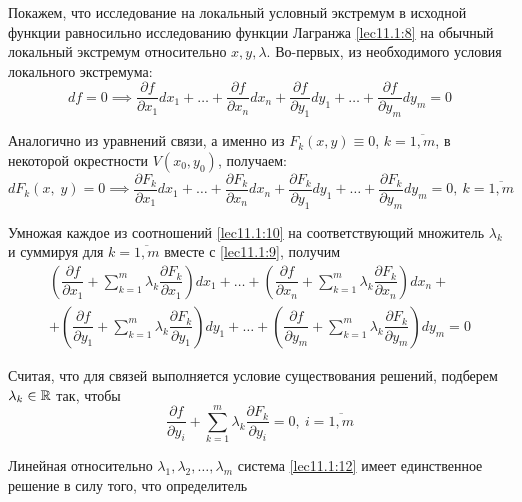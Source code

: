 \documentclass[../../main.tex]{subfiles}
\begin{document}
	
	Покажем, что исследование на локальный условный экстремум в исходной 
	функции равносильно исследованию функции Лагранжа 
	\eqref{lec11.1:8} на обычный локальный экстремум относительно $x, y,\lambda$.
	Во-первых, из необходимого условия локального экстремума:
	\begin{equation}
	df = 0 \implies \dfrac{\partial f}{\partial x_1} dx_1 + \ldots + 
	\dfrac{\partial f}{\partial x_n} dx_n + \dfrac{\partial f}{\partial y_1}dy_1
	 + \ldots + \dfrac{\partial f}{\partial y_m} dy_m = 0 \label{lec11.1:9}
	\end{equation}
	
	Аналогично из уравнений связи, а именно из $F_k(x, y) \equiv 0$, $k = 
	\overline{1, 
	m}$, в некоторой окрестности $V(x_0, y_0)$, получаем:
	\begin{equation}
	dF_k\left(x, \; y\right) = 0 \implies \dfrac{\partial 
	F_k}{\partial x_1}dx_1 + 
	\ldots + \dfrac{\partial F_k}{\partial x_n}dx_n + 
	\dfrac{\partial F_k}{\partial y_1}dy_1 + \ldots + 
	\dfrac{\partial F_k}{\partial y_m}dy_m = 0,\ k = \overline{1, m} 
	\label{lec11.1:10}
	\end{equation}
	
	Умножая каждое из соотношений \eqref{lec11.1:10} на соответствующий множитель 
	$\lambda_k$ и суммируя для $k = \overline{1, m}$ 
	вместе с \eqref{lec11.1:9}, получим
	\begin{multline}
	\left(\dfrac{\partial f}{\partial x_1} + \sum\limits_{k
	= 1}^m \lambda_k \dfrac{\partial F_k}{\partial x_1} 
	\right)dx_1 + \ldots + \left(\dfrac{\partial f}
	{\partial x_n} + \sum\limits_{k = 1}^m \lambda_k 
	\dfrac{\partial F_k}{\partial x_n} \right)dx_n + \\ +
	\left(\dfrac{\partial f}{\partial y_1} + 
	\sum\limits_{k = 1}^m \lambda_k \dfrac{\partial F_k}
	{\partial y_1} \right)dy_1 +
	\ldots 
	+ \left(\dfrac{\partial f}{\partial y_m} + 
	\sum\limits_{k = 1}^m \lambda_k \dfrac{\partial F_k}
	{\partial y_m} \right)dy_m = 0 \label{lec11.1:11}
	\end{multline}
	
	Считая, что для связей выполняется условие существования 
	решений, подберем $\lambda_k \in \mathbb{R}$ так, чтобы
	\begin{equation}
	\dfrac{\partial f}{\partial y_i} + \sum\limits_{k = 1}^m \lambda_k 
	\dfrac{\partial F_k}{\partial y_i} = 0,\ i = \overline{1,m} 
	\label{lec11.1:12}
	\end{equation}
	
	Линейная относительно $\lambda_1, \lambda_2, \ldots, \lambda_m$ система 
	\eqref{lec11.1:12} имеет единственное решение в силу того, что определитель
	
\end{document}
